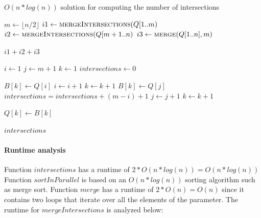 \begin{algorithm} [H]
	\caption{$O(n * log(n))$ solution for computing the number of intersections}
	
	\begin{algorithmic}
	  	\State {} 
		
		\Return {} 
	  \EndFunction
	  
	  \EndFunction
	  
		
		\EndIf
	  
	  	\State $m \gets \lfloor n/2 \rfloor$
		\State $i1 \gets \Call{mergeIntersections}{Q[1 .. m}$	
		\State $i2 \gets \Call{mergeIntersections}{Q[m + 1 .. n}$
		\State $i3 \gets \Call{merge}{Q[1 .. n], m}$ 
	 
	 	\Return $i1 + i2 + i3$
	  \EndFunction
	  
	  	\State $i \gets 1$
	  	\State $j \gets m + 1$
		\State $k \gets 1$
	  	\State $intersections \gets 0$
		
				\State $B[k] \gets Q[i]$
				\State $i \gets i + 1$ 
				\State $k \gets k + 1$
			\Else
				\State $B[k] \gets Q[j]$
				\State $intersections = intersections + (m - i) + 1$
				\State $j \gets j + 1$ 
				\State $k \gets k + 1$
			\EndIf
		
				\State $Q[k] \gets B[k]$
			\EndFor
			
		\EndWhile
		
	\Return $intersections$
	\EndFunction
	  
	\end{algorithmic}
\end{algorithm}

\paragraph{Runtime analysis}
	  
Function $intersections$ has a runtime of $2*O(n* log(n)) = O(n* log(n))$
Function $sortInParallel$ is based on an $O(n* log(n))$ sorting algorithm such as merge sort.
Function $merge$ has a runtime of $2*O(n) = O(n)$ since it contains two loops that iterate over all the elements of the parameter.
The runtime for $mergeIntersections$ is analyzed below: \\


